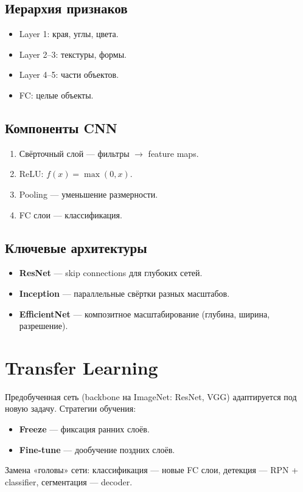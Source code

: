 \documentclass[a4paper,12pt]{article}
\begin{document}
\subsection{Иерархия признаков}
\begin{itemize}
    \item Layer 1: края, углы, цвета.
    \item Layer 2--3: текстуры, формы.
    \item Layer 4--5: части объектов.
    \item FC: целые объекты.
\end{itemize}

\subsection{Компоненты CNN}
\begin{enumerate}
    \item Свёрточный слой — фильтры $\to$ feature maps.
    \item ReLU: $f(x) = \max(0, x)$.
    \item Pooling — уменьшение размерности.
    \item FC слои — классификация.
\end{enumerate}

\subsection{Ключевые архитектуры}
\begin{itemize}
    \item \textbf{ResNet} — skip connections для глубоких сетей.
    \item \textbf{Inception} — параллельные свёртки разных масштабов.
    \item \textbf{EfficientNet} — композитное масштабирование (глубина, ширина, разрешение).
\end{itemize}

\section{Transfer Learning}

Предобученная сеть (backbone на ImageNet: ResNet, VGG) адаптируется под новую задачу. Стратегии обучения:
\begin{itemize}
    \item \textbf{Freeze} — фиксация ранних слоёв.
    \item \textbf{Fine-tune} — дообучение поздних слоёв.
\end{itemize}
Замена «головы» сети: классификация — новые FC слои, детекция — RPN + classifier, сегментация — decoder.
\end{document}
